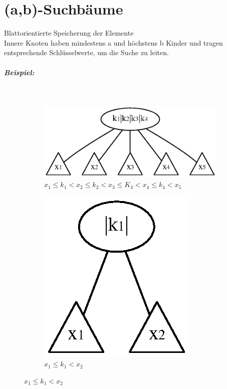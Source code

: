 \chapter{(a,b)-Suchbäume}
Blattorientierte Speicherung der Elemente\\
Innere Knoten haben mindestens a und höchstens b Kinder und tragen entsprechende Schlüsselwerte, um die Suche zu leiten.
\paragraph{Beispiel:}
$ $
\begin{figure}[H]
\centering
\begin{subfigure}[H]{0.6\linewidth}
	\centering
	\includegraphics[width=0.8\linewidth]{12/Grafik/graph1}
	\caption{$x_1\leq k_1<x_2\leq k_2<x_3\leq K_3<x_4\leq k_4<x_5$}
	\label{fig:graph1}
\end{subfigure}
\begin{subfigure}[H]{0.3\linewidth}
	\centering
	\includegraphics[width=0.7\linewidth]{12/Grafik/graph2}
	\caption{$x_1\leq k_1<x_2$}
	\label{fig:graph2}
\end{subfigure}
\end{figure}


